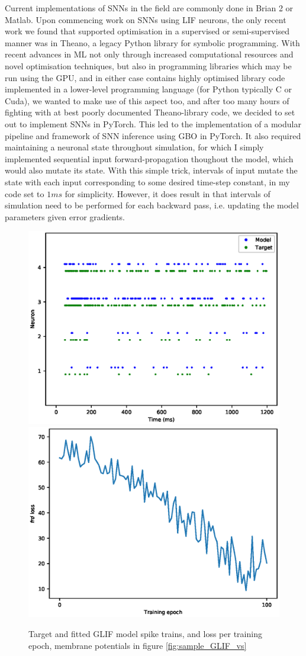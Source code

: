 \documentclass[mphil,deptreport,ianc]{infthesis} %
\begin{document}
Current implementations of SNNs in the field are commonly done in Brian 2 or Matlab. 
Upon commencing work on SNNs using LIF neurons, the only recent work we found that supported optimisation in a supervised or semi-supervised manner was in Theano, a legacy Python library for symbolic programming.
With recent advances in ML not only through increased computational resources and novel optimisation techniques, but also in programming libraries which may be run using the GPU, and in either case contains highly optimised library code implemented in a lower-level programming language (for Python typically C or Cuda), we wanted to make use of this aspect too, and after too many hours of fighting with at best poorly documented Theano-library code, we decided to set out to implement SNNs in PyTorch.
This led to the implementation of a modular pipeline and framework of SNN inference using GBO in PyTorch.
It also required maintaining a neuronal state throughout simulation, for which I simply implemented sequential input forward-propagation thoughout the model, which would also mutate its state.
With this simple trick, intervals of input mutate the state with each input corresponding to some desired time-step constant, in my code set to $1 \si{ms}$ for simplicity.
However, it does result in that intervals of simulation need to be performed for each backward pass, i.e. updating the model parameters given error gradients.

\begin{figure}
    \centering
    \includegraphics[width=0.49\columnwidth]{figures/samples/SameModelClassTarget/export_spike_trains_euid_12-10_09-45-02-423.eps}
    \includegraphics[width=0.49\columnwidth]{figures/samples/SameModelClassTarget/export_GLIF_plot_loss_euid_12-09_16-17-13-464.eps}
    \caption{Target and fitted GLIF model spike trains, and loss per training epoch, membrane potentials in figure \ref{fig:sample_GLIF_vs}}
    \label{fig:sample_GLIF_spikes_loss}
\end{figure}
\end{document}
